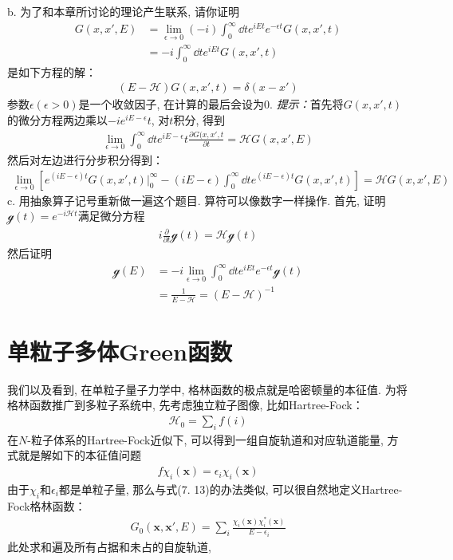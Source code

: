 {\noindent b. 为了和本章所讨论的理论产生联系, 请你证明
\begin{align*}
G(x,x',E) & = \lim_{\epsilon\to0}(-i) \int_0^\infty\dd t e^{iEt}e^{-\epsilon t} G(x,x',t)\\
          & = -i \int_{0}^{\infty}\dd t e^{iEt}G(x,x',t)
\end{align*}
是如下方程的解：
\begin{align*}
(E-\mathscr{H})G(x,x',t) = \delta(x - x')
\end{align*}
参数$\epsilon(\epsilon>0)$是一个收敛因子, 
在计算的最后会设为$0$. 
\textit{提示：}首先将$G(x,x',t)$的微分方程两边乘以$-ie^{iE-\epsilon}t$, 
对$t$积分, 
得到
\begin{align*}
\lim\limits_{\epsilon\to 0} \int_0^\infty\dd t e^{iE-\epsilon}t \frac{\partial G(x,x',t}{\partial t} = \mathscr{H} G(x,x',E)
\end{align*}
然后对左边进行分步积分得到：
\begin{align*}
\lim\limits_{\epsilon\to 0} \left[ e^{(iE-\epsilon)t}G(x,x',t)\Big|_0^\infty - (iE-\epsilon)\int_{0}^{\infty}\dd t e^{(iE-\epsilon)t}G(x,x',t) \right] = \mathscr{H} G(x,x',E)
\end{align*}
\noindent c. 用抽象算子记号重新做一遍这个题目. 算符可以像数字一样操作. 首先, 证明$\mathscr{g}(t) = e^{-i\mathscr{H}t}$满足微分方程
\begin{align*}
i\frac{\partial}{\partial t}\mathscr{g}(t) = \mathscr{Hg}(t)
\end{align*}
然后证明
\begin{align*}
\mathscr{g}(E) &= -i\lim\limits_{\epsilon\to 0}\int_{0}^{\infty} \dd t e^{iEt} e^{-\epsilon t}\mathscr{g}(t)\\
             & = \frac{1}{E-\mathscr{H}} = (E-\mathscr{H})^{-1}
\end{align*}
}

\section{单粒子多体Green函数}
我们以及看到, 
在单粒子量子力学中, 
格林函数的极点就是哈密顿量的本征值. 
为将格林函数推广到多粒子系统中, 
先考虑独立粒子图像, 
比如Hartree-Fock：
\begin{align}
\mathscr{H}_0 = \sum_i f(i)
\end{align} 
在$N$-粒子体系的Hartree-Fock近似下, 
可以得到一组自旋轨道和对应轨道能量, 
方式就是解如下的本征值问题
\begin{align}
f\chi_i(\mathbf{x}) = \epsilon_i\chi_i(\mathbf{x})
\end{align}
由于$\chi_i$和$\epsilon_i$都是单粒子量, 
那么与式(7.
13)的办法类似, 
可以很自然地定义Hartree-Fock格林函数：
\begin{align}
G_0(\mathbf{x,x'},E) = \sum_i \frac{\chi_i(\mathbf{x})\chi_i^*(\mathbf{x})}{E-\epsilon_i}
\end{align}
此处求和遍及所有占据和未占的自旋轨道,

